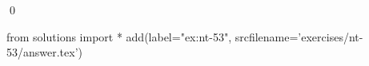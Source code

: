 
\begin{ex} 
  \label{ex:nt-53}
  
  \qed
\end{ex} 
\begin{python0}
from solutions import *
add(label="ex:nt-53",
    srcfilename='exercises/nt-53/answer.tex') 
\end{python0}
